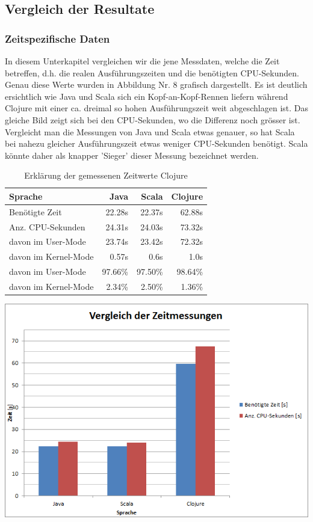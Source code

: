 \documentclass{fancydocument}
\begin{document}
\subsection{Vergleich der Resultate}
\subsubsection{Zeitspezifische Daten}
In diesem Unterkapitel vergleichen wir die jene Messdaten, welche die Zeit betreffen, d.h. die realen Ausführungszeiten und die benötigten CPU-Sekunden. Genau diese Werte wurden in Abbildung Nr. 8 grafisch dargestellt. Es ist deutlich ersichtlich wie Java und Scala sich ein Kopf-an-Kopf-Rennen liefern während Clojure mit einer ca. dreimal so hohen Ausführungszeit weit abgeschlagen ist. Das gleiche Bild zeigt sich bei den CPU-Sekunden, wo die Differenz noch grösser ist. Vergleicht man die Messungen von Java und Scala etwas genauer, so hat Scala bei nahezu gleicher Ausführungszeit etwas weniger CPU-Sekunden benötigt. Scala könnte daher als knapper 'Sieger' dieser Messung bezeichnet werden.
\begin{table}[h!]
\centering
\begin{tabular}{|p{6cm}|r|r|r|} \hline
Sprache & Java & Scala & Clojure \\
\hline
Benötigte Zeit & 22.28s & 22.37s & 62.88s\\
\hline
Anz. CPU-Sekunden & 24.31s & 24.03s & 73.32s\\
\hline
davon im User-Mode & 23.74s & 23.42s & 72.32s\\
\hline
davon im Kernel-Mode & 0.57s & 0.6s & 1.0s\\
\hline
davon im User-Mode & 97.66\% & 97.50\% & 98.64\%\\
\hline
davon im Kernel-Mode & 2.34\% & 2.50\% & 1.36\%\\
\hline
\end{tabular}
\caption{Erklärung der gemessenen Zeitwerte Clojure}
\end{table}
\begin{center}
\includegraphics[width=\linewidth]{bilder/TimeAll.png}
\end{center}
\end{document}
